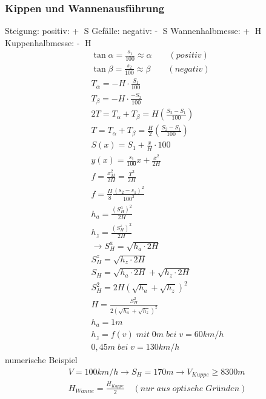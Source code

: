 \documentclass[12pt]{article}
\begin{document}
\subsubsection{Kippen und Wannenausführung}
Steigung: positiv: \textcircled{+} S \newline
Gefälle: negativ: \textcircled{-} S \newline
Wannenhalbmesse: \textcircled{+} H \newline
Kuppenhalbmesse: \textcircled{-} H \newline
\begin{gather*}
\tan \alpha = \frac{s_1}{100} \approx \alpha \qquad(positiv) \\
\tan \beta = \frac{s_2}{100} \approx \beta \qquad (negativ) \\
T_{\alpha} = -H \cdot \frac{S_1}{100} \\
T_{\beta} = -H \cdot \frac{-S_2}{100} \\
2T = T_{\alpha} + T_{\beta} = H(\frac{S_2 - S_1}{100}) \\
T = T_{\alpha} + T_{\beta} = \frac{H}{2}(\frac{S_2 - S_1}{100}) \\
S(x) = S_1 + \frac{x}{H} \cdot 100 \\
y(x) = \frac{s_1}{100}x + \frac{x^2}{2H} \\
f = \frac{x_M^2}{2H} = \frac{T^2}{2H} \\
f = \frac{H}{8} \frac{(s_2 - s_1)^2}{100^2} \\
h_a = \frac{(S_H^a)^2}{2H} \\
h_z = \frac{(S_H^z)^2}{2H} \\
\longrightarrow S_H^{a} = \sqrt{h_a \cdot 2H} \\
S_H^z = \sqrt{h_z \cdot 2H} \\
S_H = \sqrt{h_a \cdot 2H} + \sqrt{h_z \cdot 2H} \\
S_H^2 = 2H (\sqrt{h_a} + \sqrt{h_z})^2 \\
H = \frac{S_H^2}{2 (\sqrt{h_a} + \sqrt{h_z})^2} \\
h_a = 1m \\
h_z = f(v)\; mit \; 0m\; bei\; v=60km/h \\
0,45m\; bei\; v=130km/h
\end{gather*}
numerische Beispiel
\begin{gather*}
V = 100km/h \longrightarrow S_H = 170m \longrightarrow V_{Kuppe} \geq 8300m \\
H_{Wanne} = \frac{H_{Kuppe}}{2}\quad (nur\; aus\; optische\; Gründen)
\end{gather*}
\subsection{}
\end{document}
